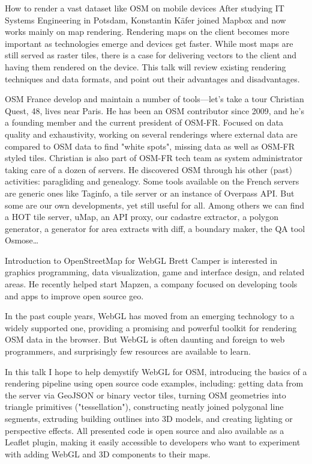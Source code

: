 %
{How to render a vast dataset like OSM on mobile devices}%
{After studying IT Systems Engineering in Potsdam, Konstantin Käfer joined Mapbox and now works mainly on map rendering.}%
{Rendering maps on the client becomes more important as technologies emerge and devices get faster. While most maps are still served as raster tiles, there is a case for delivering vectors to the client and having them rendered on the device. This talk will review existing rendering techniques and data formats, and point out their advantages and disadvantages.}

%
{OSM France develop and maintain a number of tools---let's take a tour}%
{Christian Quest, 48, lives near Paris. He has been an OSM contributor
since 2009, and he's a founding member and the current president of
OSM-FR. Focused on data quality and exhaustivity, working on several
renderings where external data are compared to OSM data to find "white
spots", missing data as well as OSM-FR styled tiles. Christian is also
part of OSM-FR tech team as system administrator taking care of a dozen
of servers. He discovered OSM through his other (past) activities:
paragliding and genealogy.}%
{Some tools available on the French servers are generic ones like Taginfo, a tile server or an instance of Overpass API. But some are our own developments, yet still useful for all. Among others we can find a HOT tile server, uMap, an API proxy, our cadastre extractor, a polygon generator, a generator for area extracts with diff, a boundary maker, the QA tool Osmose\dots}



%
{Introduction to OpenStreetMap for WebGL}%
{Brett Camper is interested in graphics programming, data visualization, game and interface design, and related areas. He recently helped start Mapzen, a company focused on developing tools and apps to improve open source geo.}%
{In the past couple years, WebGL has moved from an emerging technology to a widely supported one, providing a promising and powerful toolkit for rendering OSM data in the browser. But WebGL is often daunting and foreign to web programmers, and surprisingly few resources are available to learn.

In this talk I hope to help demystify WebGL for OSM, introducing the basics of a rendering pipeline using open source code examples, including: getting data from the server via GeoJSON or binary vector tiles, turning OSM geometries into triangle primitives ("tessellation"), constructing neatly joined polygonal line segments, extruding building outlines into 3D models, and creating lighting or perspective effects. All presented code is open source and also available as a Leaflet plugin, making it easily accessible to developers who want to experiment with adding WebGL and 3D components to their maps.}


